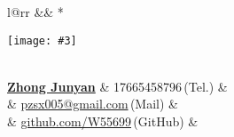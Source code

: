 \newcommand{\paint}[3]{
    \begin{minipage}{#1}
        \texttt{[image: \#3]}
    \end{minipage}
}
\newcommand{\myheader}{
\begin{tabular*}{\textwidth}{l@{\extracolsep{\fill}}rr}
  && \multirow{4}*{\paint{2.6cm}{3.2cm}{./image.jpg}}\\
  \specialrule{0em}{3pt}{3pt}
  \textbf{\href{http://herechen.github.io}{\LARGE Zhong Junyan}} & 17665458796$\,${\color{labelgrey}(Tel.)} &\\
 & \href{mailto:pzsx005@gmail.com}{pzsx005@gmail.com}$\,${\color{labelgrey}(Mail)} & \\
   & \href{https://github.com/W55699}{github.com/W55699}$\,${\color{labelgrey}(GitHub)} & \\
  \end{tabular*}\\\vspace{0.1in}
}

\myheader

